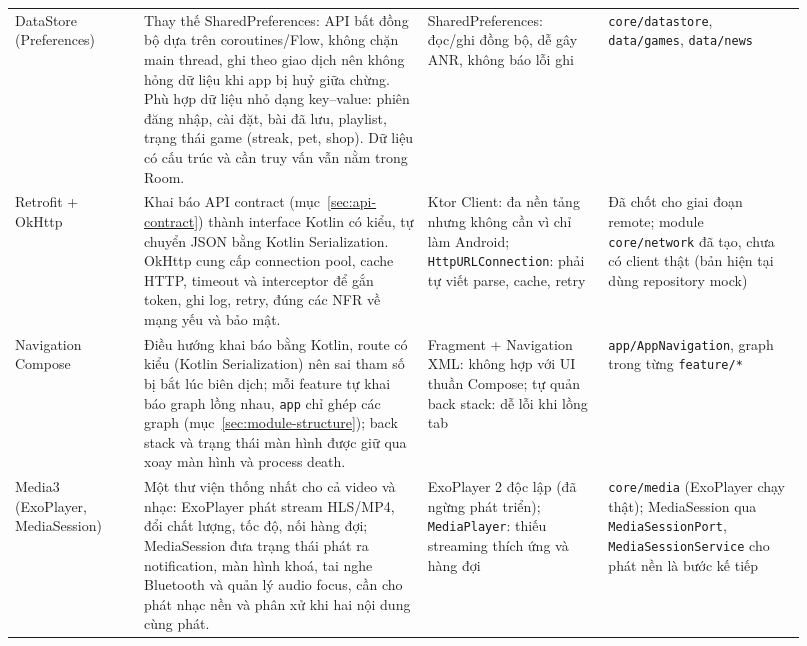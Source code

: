 \begin{longtable}{>{\RaggedRight\arraybackslash}p{0.15\linewidth}>{\RaggedRight\arraybackslash}p{0.33\linewidth}>{\RaggedRight\arraybackslash}p{0.21\linewidth}>{\RaggedRight\arraybackslash}p{0.23\linewidth}}
DataStore (Preferences) & Thay thế SharedPreferences: API bất đồng bộ dựa trên coroutines/Flow, không chặn main thread, ghi theo giao dịch nên không hỏng dữ liệu khi app bị huỷ giữa chừng. Phù hợp dữ liệu nhỏ dạng key--value: phiên đăng nhập, cài đặt, bài đã lưu, playlist, trạng thái game (streak, pet, shop). Dữ liệu có cấu trúc và cần truy vấn vẫn nằm trong Room. & SharedPreferences: đọc/ghi đồng bộ, dễ gây ANR, không báo lỗi ghi & \texttt{core/datastore}, \texttt{data/games}, \texttt{data/news} \\
Retrofit + OkHttp & Khai báo API contract (mục~\ref{sec:api-contract}) thành interface Kotlin có kiểu, tự chuyển JSON bằng Kotlin Serialization. OkHttp cung cấp connection pool, cache HTTP, timeout và interceptor để gắn token, ghi log, retry, đúng các NFR về mạng yếu và bảo mật. & Ktor Client: đa nền tảng nhưng không cần vì chỉ làm Android; \texttt{HttpURLConnection}: phải tự viết parse, cache, retry & Đã chốt cho giai đoạn remote; module \texttt{core/network} đã tạo, chưa có client thật (bản hiện tại dùng repository mock) \\
Navigation Compose & Điều hướng khai báo bằng Kotlin, route có kiểu (Kotlin Serialization) nên sai tham số bị bắt lúc biên dịch; mỗi feature tự khai báo graph lồng nhau, \texttt{app} chỉ ghép các graph (mục~\ref{sec:module-structure}); back stack và trạng thái màn hình được giữ qua xoay màn hình và process death. & Fragment + Navigation XML: không hợp với UI thuần Compose; tự quản back stack: dễ lỗi khi lồng tab & \texttt{app/AppNavigation}, graph trong từng \texttt{feature/*} \\
Media3 (ExoPlayer, MediaSession) & Một thư viện thống nhất cho cả video và nhạc: ExoPlayer phát stream HLS/MP4, đổi chất lượng, tốc độ, nối hàng đợi; MediaSession đưa trạng thái phát ra notification, màn hình khoá, tai nghe Bluetooth và quản lý audio focus, cần cho phát nhạc nền và phân xử khi hai nội dung cùng phát. & ExoPlayer 2 độc lập (đã ngừng phát triển); \texttt{MediaPlayer}: thiếu streaming thích ứng và hàng đợi & \texttt{core/media} (ExoPlayer chạy thật); MediaSession qua \texttt{MediaSessionPort}, \texttt{MediaSessionService} cho phát nền là bước kế tiếp \\
\end{longtable}
\endgroup
